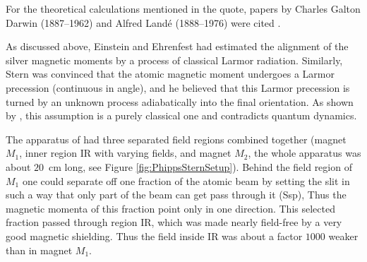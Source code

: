 \documentclass[12pt]{article}
\begin{document}
For the theoretical calculations mentioned in the quote, papers by Charles Galton Darwin (1887--1962) and Alfred Land\'e (1888--1976) were cited \citep{DarwinC1928Motion,LandeA1929Polarisation}.

As discussed above, Einstein and Ehrenfest had estimated the alignment of the silver magnetic moments by a process of classical Larmor radiation.
Similarly, Stern was convinced that the atomic magnetic moment undergoes a Larmor precession (continuous in angle), and he believed that this Larmor precession is turned by an unknown process adiabatically into the final orientation.  As shown by \cite{HermansphanNEtal2000Observation}, this assumption is a purely classical one and contradicts quantum dynamics.

The apparatus of \cite{PhippsTEtal1932Einstellung} had three separated field regions combined together (magnet $M_1$, inner region IR with varying fields, and magnet $M_2$, the whole apparatus was about $20$~cm long, see Figure \ref{fig:PhippsSternSetup}). Behind the field region of $M_1$ one could separate off one fraction of the atomic beam by setting the slit in such a way that only part of the beam can get pass through it (Ssp), Thus the magnetic momenta of this fraction point only in one direction. This selected fraction passed through region IR, which was made nearly field-free by a very good magnetic shielding. Thus the field inside IR was about a factor $1000$ weaker than in magnet $M_1$. 
\end{document}
